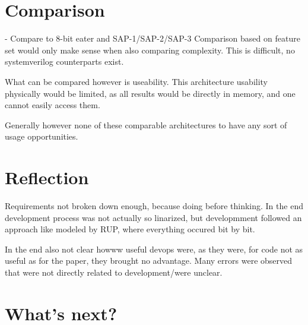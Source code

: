 \section{Comparison}
- Compare to 8-bit eater and SAP-1/SAP-2/SAP-3
Comparison based on feature set would only make sense when also comparing complexity. This is difficult, no systemverilog counterparts exist. 

What can be compared however is useability. 
This architecture usability physically would be limited, as all results would be directly in memory, and one cannot easily access them.

Generally however none of these comparable architectures to have any sort of usage opportunities.
\section{Reflection}
Requirements not broken down enough, because doing before thinking. In the end development process was not actually so linarized, but developmment followed an approach like modeled by RUP,  where everything occured bit by bit. 

In the end also not clear howww useful devops were, as they were, for code not as useful as for the paper, they brought no advantage. Many errors were observed that were not directly related to development/were unclear. 

\section{What's next?}

